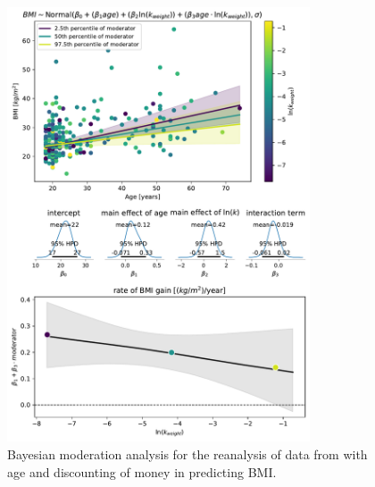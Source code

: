 \documentclass[12pt, a4paper]{article}
\begin{document}
\begin{figure} 
	\centering
	\includegraphics[width=0.8\textwidth]{veillard_vincent_2020_reanalysis/veillard_vincent_reanalysis_weight.pdf} 
	\caption{Bayesian moderation analysis for the reanalysis of data from \cite{VeillardVincent2020} with age and discounting of money in predicting BMI.}
	\label{fig:vv_money}
\end{figure}
\end{document}
